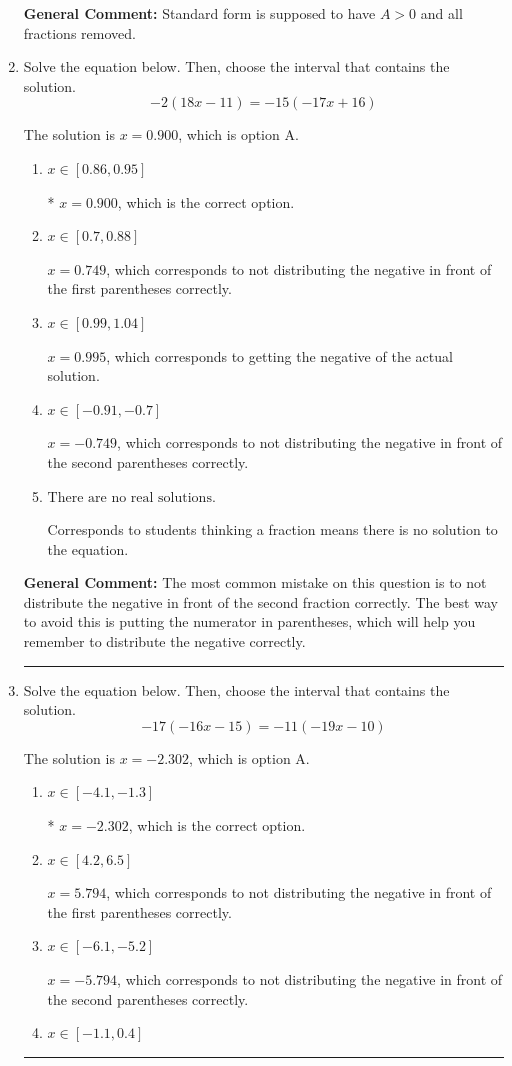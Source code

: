 \documentclass{extbook}[14pt]
\newcommand{\litem}[1]{\item #1

\rule{\textwidth}{0.4pt}}
\begin{document}
\begin{enumerate}
{\textbf{General Comment:} Standard form is supposed to have $A > 0$ and all fractions removed.
}
\litem{
Solve the equation below. Then, choose the interval that contains the solution.
\[ -2(18x -11) = -15(-17x + 16) \]

The solution is \( x = 0.900 \), which is option A.\begin{enumerate}[label=\Alph*.]
\item \( x \in [0.86, 0.95] \)

* $x = 0.900$, which is the correct option.
\item \( x \in [0.7, 0.88] \)

$x = 0.749$, which corresponds to not distributing the negative in front of the first parentheses correctly.
\item \( x \in [0.99, 1.04] \)

$x = 0.995$, which corresponds to getting the negative of the actual solution.
\item \( x \in [-0.91, -0.7] \)

$x = -0.749$, which corresponds to not distributing the negative in front of the second parentheses correctly.
\item \( \text{There are no real solutions.} \)

Corresponds to students thinking a fraction means there is no solution to the equation.
\end{enumerate}

\textbf{General Comment:} The most common mistake on this question is to not distribute the negative in front of the second fraction correctly. The best way to avoid this is putting the numerator in parentheses, which will help you remember to distribute the negative correctly.
}
\litem{
Solve the equation below. Then, choose the interval that contains the solution.
\[ -17(-16x -15) = -11(-19x -10) \]

The solution is \( x = -2.302 \), which is option A.\begin{enumerate}[label=\Alph*.]
\item \( x \in [-4.1, -1.3] \)

* $x = -2.302$, which is the correct option.
\item \( x \in [4.2, 6.5] \)

$x = 5.794$, which corresponds to not distributing the negative in front of the first parentheses correctly.
\item \( x \in [-6.1, -5.2] \)

$x = -5.794$, which corresponds to not distributing the negative in front of the second parentheses correctly.
\item \( x \in [-1.1, 0.4] \)


\end{enumerate}}
\end{enumerate}
\end{document}
